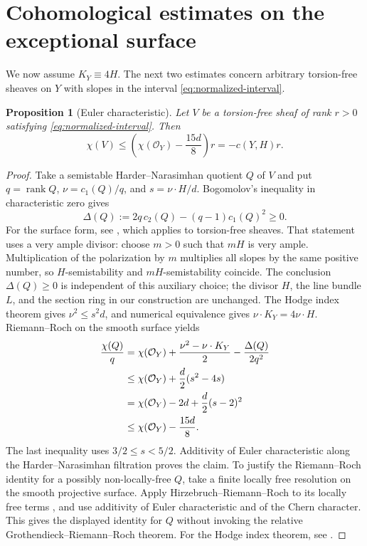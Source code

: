 \documentclass[11pt,reqno]{amsart}
\numberwithin{equation}{section}
\newtheorem{proposition}[theorem]{Proposition}
\theoremstyle{definition}
\theoremstyle{remark}
\newcommand{\OO}{\mathcal O}
\newcommand{\rk}{\operatorname{rank}}
\begin{document}
\section{Cohomological estimates on the exceptional surface}\label{sec:surface-estimates}

We now assume $K_Y\equiv4H$. The next two estimates concern arbitrary
torsion-free sheaves on $Y$ with slopes in the interval
\eqref{eq:normalized-interval}.

\begin{proposition}[Euler characteristic]\label{prop:euler}
Let $V$ be a torsion-free sheaf of rank $r>0$ satisfying
\eqref{eq:normalized-interval}. Then
\begin{equation}\label{eq:euler-bound}
 \chi(V)\leq
 \left(\chi(\OO_Y)-\frac{15d}{8}\right)r=-c(Y,H)r.
\end{equation}
\end{proposition}

\begin{proof}
Take a semistable Harder--Narasimhan quotient $Q$ of $V$ and put
$q=\rk Q$, $\nu=c_1(Q)/q$, and $s=\nu\cdot H/d$.
Bogomolov's inequality in characteristic zero gives
\[
 \Delta(Q):=2q\,c_2(Q)-(q-1)c_1(Q)^2\geq0.
\]
For the surface form, see \cite[Theorem 4.4]{Langer2022}, which applies
to torsion-free sheaves. That statement uses a very ample divisor:
choose $m>0$ such that $mH$ is very ample. Multiplication of the
polarization by $m$ multiplies all slopes by the same positive number,
so $H$-semistability and $mH$-semistability coincide. The conclusion
$\Delta(Q)\geq0$ is independent of this auxiliary choice; the divisor
$H$, the line bundle $L$, and the section ring in our construction
are unchanged. The Hodge index theorem gives $\nu^2\leq s^2d$,
and numerical equivalence gives $\nu\cdot K_Y=4\nu\cdot H$.
Riemann--Roch on the smooth surface yields
\begin{align}
 \frac{\chi(Q)}{q}
 &=\chi(\OO_Y)+\frac{\nu^2-\nu\cdot K_Y}{2}
              -\frac{\Delta(Q)}{2q^2}\notag\\
 &\leq\chi(\OO_Y)+\frac d2(s^2-4s)\notag\\
 &=\chi(\OO_Y)-2d+\frac d2(s-2)^2\notag\\
 &\leq\chi(\OO_Y)-\frac{15d}{8}.
 \label{eq:RR}
\end{align}
The last inequality uses $3/2\leq s<5/2$. Additivity of Euler
characteristic along the Harder--Narasimhan filtration proves the
claim. To justify the Riemann--Roch identity for a possibly non-locally-free
$Q$, take a finite locally free resolution on the smooth projective
surface. Apply Hirzebruch--Riemann--Roch to its locally free terms
\cite[Appendix A, Theorem 4.1]{Hartshorne1977}, and use additivity of
Euler characteristic and of the Chern character. This gives the displayed
identity for $Q$ without invoking the relative Grothendieck--Riemann--Roch
theorem. For the Hodge index theorem, see
\cite[Chapter V, Theorem 1.9]{Hartshorne1977}.
\end{proof}
\end{document}
